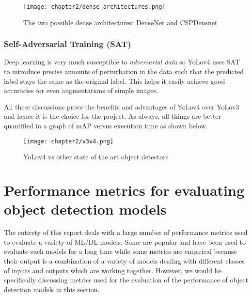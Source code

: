 \begin{figure}[h]
  \centering
  \texttt{[image: chapter2/dense\_architectures.png]}
  \caption{The two possible dense architectures: DenseNet and CSPDensnet}
  \label{fig:dense_arch}
\end{figure}

\subsubsection{Self-Adversarial Training (SAT)}
Deep learning is very much susceptible to \textit{adversarial data} so YoLov4 uses SAT to introduce precise amounts of perturbation in the data such that the predicted label stays the same as the original label. This helps it easily achieve good accuracies for even augmentations of simple images.

All these discussions prove the benefits and advantages of YoLov4 over YoLov3 and hence it is the choice for the project. As always, all things are better quantified in a graph of mAP versus execution time as shown below.

\begin{figure}[h]
  \centering
  \texttt{[image: chapter2/v3v4.png]}
  \caption{YoLov4 vs other state of the art object detectors}
  \label{fig:v3_vs_v4}
\end{figure}


\section{Performance metrics for evaluating object detection models \cite{Koech2020}}  \label{metrics}

The entirety of this report deals with a large number of performance metrics used to evaluate a variety of ML/DL models. Some are popular and have been used to evaluate such models for a long time while some metrics are empirical because their output is a combination of a variety of models dealing with different classes of inputs and outputs which are working together. However, we would be specifically discussing metrics used for the evaluation of the performance of object detection models in this section.
